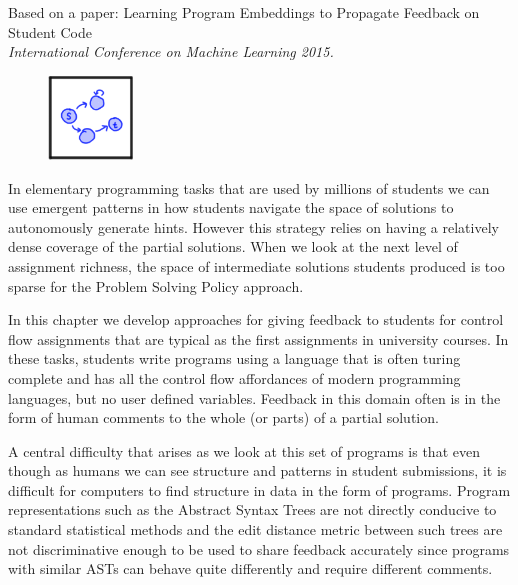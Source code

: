 Based on a paper: Learning Program Embeddings to Propagate Feedback on Student Code \\ \emph{International Conference on Machine Learning 2015.}

\vspace{7mm}

\begin{figure}[h!]
\includegraphics[width=0.2\textwidth]{img/assnType_3}
\end{figure}

\vspace{7mm}

In elementary programming tasks that are used by millions of students we can use emergent patterns in how students navigate the space of solutions to autonomously generate hints. However this strategy relies on having a relatively dense coverage of the partial solutions. When we look at the next level of assignment richness, the space of intermediate solutions students produced is too sparse for the Problem Solving Policy approach. 

In this chapter we develop approaches for giving feedback to students for control flow assignments that are typical as the first assignments in university courses. In these tasks, students write programs using a language that is often turing complete and has all the control flow affordances of modern programming languages, but no user defined variables. Feedback in this domain often is in the form of human comments to the whole (or parts) of a partial solution. 

A central difficulty that arises as we look at this set of programs is that even though as humans we can see structure and patterns in student submissions, it is difficult for computers to find structure in data in the form of programs.  Program representations
such as the Abstract Syntax Trees are not directly conducive to standard statistical methods and the edit distance metric between such trees 
are not discriminative enough to be used to share feedback accurately since programs with similar ASTs can behave quite differently and require different comments. 

